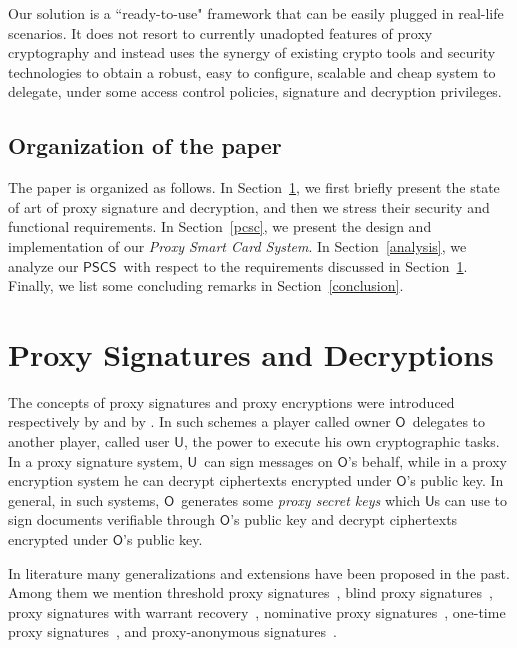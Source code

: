 \documentclass[preprint,authoryear,12pt]{elsarticle}
\newcommand{\Owner}{\ensuremath{\mathsf{O}}}
\newcommand{\User}{\ensuremath{\mathsf{U}}}
\newcommand{\PSCS}{\ensuremath{\mathsf{PSCS}}}
\begin{document}
Our solution is a ``ready-to-use" framework that can be easily plugged in real-life scenarios. It does not resort to currently unadopted features of proxy cryptography and instead uses the synergy of existing crypto tools and security technologies to obtain a robust, easy to configure, scalable and cheap system to delegate, under some access control policies, signature and decryption privileges.

\subsection{Organization of the paper} The paper is organized as follows. In Section~\ref{relatedwork},  we first briefly present the state of art of proxy signature and decryption, and then we stress their security and functional requirements. In Section~\ref{pcsc}, we present the design and implementation of our  \emph{Proxy Smart Card System}. In Section~\ref{analysis}, we analyze our \PSCS\ with respect to the requirements discussed in Section~\ref{relatedwork}. Finally, we list some concluding remarks in 
Section~\ref{conclusion}.


\section{Proxy Signatures and Decryptions}
\label{relatedwork}
The concepts of proxy signatures and proxy encryptions were introduced respectively by \citet{DBLP:conf/ccs/MamboUO96} and by \citet{MamboO97}.  In such schemes a player called owner \Owner\, delegates to another player, called user \User, the power to execute his own cryptographic tasks. In a proxy signature system, \User\ can sign messages on \Owner's behalf, while in a proxy encryption system he can decrypt ciphertexts encrypted under \Owner's public key. In general, in such systems, \Owner\ generates some \emph{proxy secret keys} which \User s can use to sign documents verifiable through \Owner's public key and decrypt ciphertexts encrypted under \Owner's  public key.

In literature many generalizations and extensions have been proposed in the past. Among them we mention threshold proxy signatures~\citep{DBLP:journals/jss/ShaoCL07}, blind proxy signatures~\citep{DBLP:conf/ism/KimC06,DBLP:conf/snpd/LiuTLZ07,DBLP:conf/csse/QinW08}, proxy signatures with warrant recovery~\citep{cryptoeprint:2003:072}, nominative proxy signatures~\citep{DBLP:conf/icics/ParkL01}, one-time proxy signatures~\citep{DBLP:conf/cans/LuCD06}, and proxy-anonymous signatures~\citep{DBLP:conf/icycs/FanZL08,DBLP:conf/scn/FuchsbauerP08,DBLP:conf/snpd/HuL07,DBLP:conf/mcam/HuLL07,DBLP:conf/iscis/Yumin06,DBLP:conf/csse/ZhouW08a}.
\end{document}
